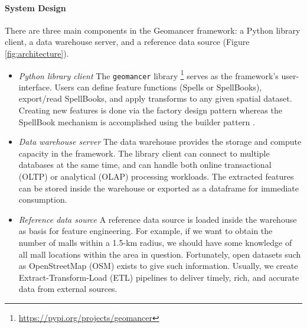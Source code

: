 \documentclass{article}
\begin{document}
\paragraph{System Design} There are three main components in the Geomancer
framework: a Python library client, a data warehouse server, and a reference
data source (Figure \ref{fig:architecture}). 

\begin{itemize}
    \item \textit{Python library client} The \texttt{geomancer} library
        \footnote{\url{https://pypi.org/projects/geomancer}} serves as the
        framework's user-interface. Users can define feature functions
        (Spells or SpellBooks), export/read SpellBooks, and apply transforms to
        any given spatial dataset. Creating new features is done via the
        factory design pattern whereas the SpellBook mechanism is accomplished
        using the builder pattern \cite{gamma1995design}.
    \item \textit{Data warehouse server} The data warehouse provides the
        storage and compute capacity in the framework. The library client can
        connect to multiple databases at the same time, and can handle both
        online transactional (OLTP) or analytical (OLAP) processing workloads.
        The extracted features can be stored inside the warehouse or exported
        as a dataframe for immediate consumption.
    \item \textit{Reference data source} A reference data source is loaded
        inside the warehouse as basis for feature engineering. For example, if
        we want to obtain the number of malls within a 1.5-km radius, we should
        have some knowledge of all mall locations within the area in question.
        Fortunately, open datasets such as OpenStreetMap (OSM) \cite{osm2017}
        exists to give such information. Usually, we create
        Extract-Transform-Load (ETL) pipelines to deliver timely, rich, and
        accurate data from external sources. 
\end{itemize}
\end{document}
